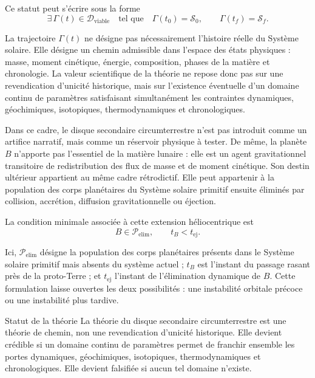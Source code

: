 \documentclass[11pt,a4paper,openany]{report}
\begin{document}
Ce statut peut s'écrire sous la forme
\begin{equation}
\boxed{
\exists\,\Gamma(t)\in\mathcal{D}_{\mathrm{viable}}
\quad\text{tel que}\quad
\Gamma(t_0)=\mathcal{S}_0,\qquad
\Gamma(t_f)=\mathcal{S}_f .
}
\label{eq:statut-retrodictif}
\end{equation}

La trajectoire $\Gamma(t)$ ne désigne pas nécessairement l'histoire réelle du
Système solaire. Elle désigne un chemin admissible dans l'espace des états
physiques : masse, moment cinétique, énergie, composition, phases de la matière
et chronologie. La valeur scientifique de la théorie ne repose donc pas sur une
revendication d'unicité historique, mais sur l'existence éventuelle d'un domaine
continu de paramètres satisfaisant simultanément les contraintes dynamiques,
géochimiques, isotopiques, thermodynamiques et chronologiques.

Dans ce cadre, le disque secondaire circumterrestre n'est pas introduit comme
un artifice narratif, mais comme un réservoir physique à tester. De même, la
planète $B$ n'apporte pas l'essentiel de la matière
lunaire : elle est un agent gravitationnel transitoire de redistribution des
flux de masse et de moment cinétique. Son destin ultérieur appartient au même
cadre rétrodictif. Elle peut appartenir à la population des corps planétaires du
Système solaire primitif ensuite éliminés par collision, accrétion, diffusion
gravitationnelle ou éjection.

La condition minimale associée à cette extension héliocentrique est
\begin{equation}
\boxed{
B\in\mathcal{P}_{\mathrm{elim}},
\qquad
 t_B<t_{\mathrm{ej}} .
}
\label{eq:B-elim-preambule}
\end{equation}

Ici, $\mathcal{P}_{\mathrm{elim}}$ désigne la population des corps planétaires
présents dans le Système solaire primitif mais absents du système actuel ;
$t_B$ est l'instant du passage rasant près de la proto-Terre ; et
$t_{\mathrm{ej}}$ l'instant de l'élimination dynamique de $B$. Cette formulation
laisse ouvertes les deux possibilités : une instabilité orbitale précoce ou une
instabilité plus tardive.

\begin{principe}{Statut de la théorie}
La théorie du disque secondaire circumterrestre est une théorie de chemin, non
une revendication d'unicité historique. Elle devient crédible si un domaine
continu de paramètres permet de franchir ensemble les portes dynamiques,
géochimiques, isotopiques, thermodynamiques et chronologiques. Elle devient
falsifiée si aucun tel domaine n'existe.
\end{principe}
\end{document}
